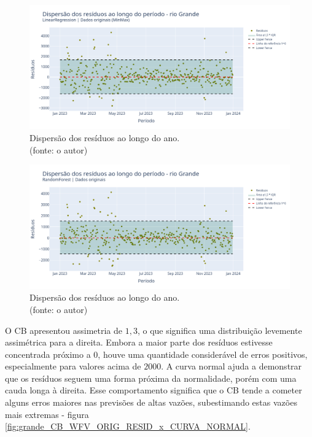 \begin{figure}[!h]
	\centering
	\includegraphics[scale=0.33]{Figuras/rio_grande/wfv/LR/LR_WFV_ORIG_RESID_x_TEMPO.png}
	\caption{Dispersão dos resíduos ao longo do ano.\\(fonte: o autor)}
	\label{fig:grande_LR_WFV_ORIG_RESID_x_TEMPO}
\end{figure}

\begin{figure}[!h]
	\centering
	\includegraphics[scale=0.33]{Figuras/rio_grande/wfv/RF/RF_WFV_ORIG_RESID_x_TEMPO.png}
	\caption{Dispersão dos resíduos ao longo do ano.\\(fonte: o autor)}
	\label{fig:grande_RF_WFV_ORIG_RESID_x_TEMPO}
\end{figure}
\clearpage

O CB apresentou assimetria de $1,3$, o que significa uma distribuição levemente assimétrica para a direita. Embora a maior parte dos resíduos estivesse concentrada próximo a $0$, houve uma quantidade considerável de erros positivos, especialmente para valores acima de $2000$. A curva normal ajuda a demonstrar que os resíduos seguem uma forma próxima da normalidade, porém com uma cauda longa à direita. Esse comportamento significa que o CB tende a cometer alguns erros maiores nas previsões de altas vazões, subestimando estas vazões mais extremas - figura \ref{fig:grande_CB_WFV_ORIG_RESID_x_CURVA_NORMAL}.

